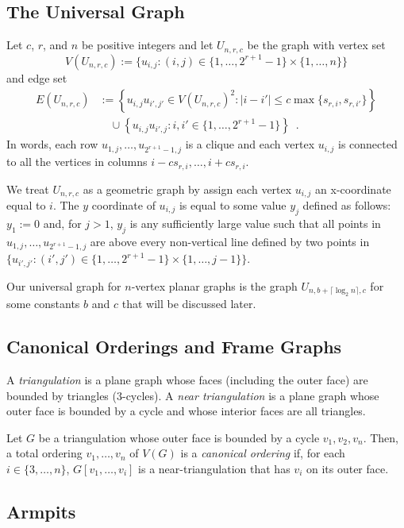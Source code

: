 \documentclass{patmorin}
\newcommand{\defin}[1]{\emph{\color{brightmaroon}#1}}
\begin{document}
\subsection{The Universal Graph}

Let $c$, $r$, and $n$ be positive integers and let $U_{n,r,c}$ be the graph with vertex set
\[
  V(U_{n,r,c}):=\{ u_{i,j}: (i,j)\in\{1,\ldots,2^{r+1}-1\}\times \{1,\ldots,n\}\}
\]
and edge set
\begin{align*}
  E(U_{n,r,c}) & := \left\{ u_{i,j}u_{i',j'} \in V(U_{n,r,c})^2: |i-i'| \le c\max\{s_{r,i},s_{r,i'}\}\right\} \\
  & \quad {}\cup\left\{u_{i,j}u_{i',j}:i,i'\in\{1,\ldots,2^{r+1}-1\}\right\}\enspace .
\end{align*}
In words, each row $u_{1,j},\ldots,u_{2^{r+1}-1,j}$ is a clique and each vertex $u_{i,j}$ is connected to all the vertices in columns $i-cs_{r,i},\ldots,i+cs_{r,i}$.

We treat $U_{n,r,c}$ as a geometric graph by assign each vertex $u_{i,j}$ an x-coordinate equal to $i$.  The $y$ coordinate of $u_{i,j}$ is equal to some value $y_j$ defined as follows:  $y_1:=0$ and, for $j>1$, $y_j$ is any sufficiently large value such that all points in $u_{1,j},\ldots,u_{2^{r+1}-1,j}$ are above every non-vertical line defined by two points in $\{u_{i',j'}:(i',j')\in\{1,\ldots,2^{r+1}-1\}\times\{1,\ldots,j-1\}\}$.

Our universal graph for $n$-vertex planar graphs is the graph $U_{n,b+\lceil\log_2 n\rceil,c}$ for some constants $b$ and $c$ that will be discussed later.

\subsection{Canonical Orderings and Frame Graphs}

A \defin{triangulation} is a plane graph whose faces (including the outer face) are bounded by triangles ($3$-cycles). A \defin{near triangulation} is a plane graph whose outer face is bounded by a cycle and whose interior faces are all triangles.

Let $G$ be a triangulation whose outer face is bounded by a cycle $v_1,v_2,v_n$.  Then, a total ordering $v_1,\ldots,v_n$ of $V(G)$ is a \defin{canonical ordering} if, for each $i\in\{3,\ldots,n\}$,  $G[v_1,\ldots,v_i]$ is a near-triangulation that has $v_i$ on its outer face.


\subsection{Armpits}
\end{document}
